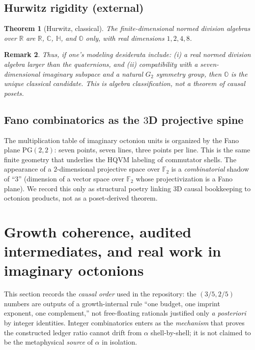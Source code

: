 \documentclass[11pt]{amsart}
\newtheorem{theorem}{Theorem}[section]
\newtheorem{remark}[theorem]{Remark}
\begin{document}
\subsection{Hurwitz rigidity (external)}

\begin{theorem}[Hurwitz, classical]
The finite-dimensional normed division algebras over \(\mathbb{R}\) are \(\mathbb{R}\), \(\mathbb{C}\), \(\mathbb{H}\), and \(\mathbb{O}\) only, with real dimensions \(1,2,4,8\).
\end{theorem}

\begin{remark}
Thus, if one's modeling desiderata include: (i) a real normed division algebra larger than the quaternions, and (ii) compatibility with a seven-dimensional imaginary subspace and a natural \(G_2\) symmetry group, then \(\mathbb{O}\) is the unique classical candidate. This is \emph{algebra classification}, not a theorem of causal posets.
\end{remark}

\subsection{Fano combinatorics as the \texorpdfstring{\(3\)D}{3D} projective spine}

The multiplication table of imaginary octonion units is organized by the Fano plane \(\mathrm{PG}(2,2)\): seven points, seven lines, three points per line. This is the same finite geometry that underlies the HQVM labeling of commutator shells. The appearance of a \(2\)-dimensional projective space over \(\mathbb{F}_2\) is a \emph{combinatorial} shadow of ``\(3\)'' (dimension of a vector space over \(\mathbb{F}_2\) whose projectivization is a Fano plane). We record this only as structural poetry linking \(3\)D causal bookkeeping to octonion products, not as a poset-derived theorem.

\section[Growth coherence and audited intermediates]{Growth coherence, audited intermediates, and real work in imaginary octonions}
\label{sec:diophantine-audit}

This section records the \emph{causal order} used in the repository: the \((3/5,2/5)\) numbers are outputs of a growth-internal rule ``one budget, one imprint exponent, one complement,'' not free-floating rationals justified only \emph{a posteriori} by integer identities. Integer combinatorics enters as the \emph{mechanism} that proves the constructed ledger ratio cannot drift from \(\alpha\) shell-by-shell; it is not claimed to be the metaphysical \emph{source} of \(\alpha\) in isolation.
\end{document}
